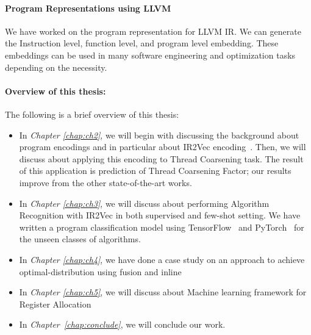 \paragraph{Program Representations using LLVM}
We have worked on the program representation for LLVM IR. We can generate the Instruction level, function level, and program level embedding. These embeddings can be used in many software engineering and optimization tasks depending on the necessity.


    	


\paragraph{Overview of this thesis:}
The following is a brief overview of this thesis:

\begin{itemize}
    \item In \textit{Chapter \ref{chap:ch2}}, we will begin with discussing the background about program encodings and in particular about IR2Vec encoding~\cite{IR2Vec}. 
    Then, we will discuss about applying this encoding to Thread Coarsening task. The result of this application is prediction of Thread Coarsening Factor; our results improve from the other state-of-the-art works.
    
    \item In \textit{Chapter \ref{chap:ch3}}, we will discuss about performing Algorithm Recognition with IR2Vec in both supervised and few-shot setting. 
    We have written a program classification model using TensorFlow~\cite{tensorflow_USENIX2016} and PyTorch~\cite{pytorch} for the unseen classes of algorithms.	

    \item In \textit{Chapter \ref{chap:ch4}}, we have done a case study on an approach to achieve optimal-distribution using fusion and inline
    
    \item In \textit{Chapter \ref{chap:ch5}}, we will discuss about Machine learning framework for Register Allocation 
    
    \item  In \textit{Chapter~\ref{chap:conclude}}, we will conclude our work.
    
    
    

\end{itemize}